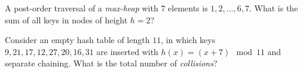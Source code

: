 \documentclass[12pt,addpoints]{exam}
\begin{document}
\begin{questions}
\question[5] 
A post-order traversal of a {\it max-heap} with $7$ elements is $1,2,\dots,6,7$.  What is the sum of all keys in nodes of height $h=2$?
\answerline

\question[5] 
Consider an empty hash table of length $11$, in which keys $9,21,17,12,27,20,16,31$ are inserted with $h(x)=(x+7) \mod 11$ and separate chaining.  What is the total number of {\it collisions}?
\answerline

\end{questions}
\end{document}
